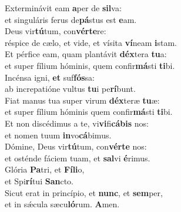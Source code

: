 \evenverse Exterminávit eam \textbf{a}per de \textbf{sil}va:~\*\\
\evenverse et singuláris ferus de\textbf{pá}stus est \textbf{e}am.\\
\oddverse Deus vir\textbf{tú}tum, con\textbf{vér}\textbf{te}re:~\*\\
\oddverse réspice de cælo, et vide, et vísita \textbf{ví}neam \textbf{i}stam.\\
\evenverse Et pérfice eam, quam plantávit \textbf{déx}tera \textbf{tu}a:~\*\\
\evenverse et super fílium hóminis, quem confir\textbf{má}sti \textbf{ti}bi.\\
\oddverse Incénsa igni, \textbf{et} suf\textbf{fós}sa:~\*\\
\oddverse ab increpatióne vultus \textbf{tu}i pe\textbf{rí}bunt.\\
\evenverse Fiat manus tua super virum \textbf{déx}teræ \textbf{tu}æ:~\*\\
\evenverse et super fílium hóminis quem confir\textbf{má}sti \textbf{ti}bi.\\
\oddverse Et non discédimus a te, vi\textbf{vi}fi\textbf{cá}\textbf{bis} nos:~\*\\
\oddverse et nomen tuum \textbf{in}vo\textbf{cá}bimus.\\
\evenverse Dómine, Deus vir\textbf{tú}tum, con\textbf{vér}\textbf{te} nos:~\*\\
\evenverse et osténde fáciem tuam, et \textbf{sal}vi \textbf{é}rimus.\\
\oddverse Glória \textbf{Pa}tri, et \textbf{Fí}\textbf{li}o,~\*\\
\oddverse et Spi\textbf{rí}tui \textbf{San}cto.\\
\evenverse Sicut erat in princípio, et \textbf{nunc}, et \textbf{sem}per,~\*\\
\evenverse et in sǽcula sæcu\textbf{ló}rum. \textbf{A}men.\\

